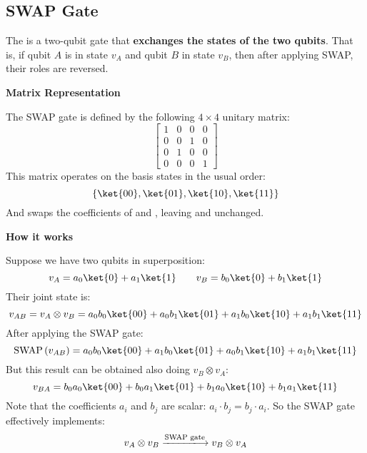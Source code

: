 \subsection{SWAP Gate}

The  is a two-qubit gate that \textbf{exchanges the states of the two qubits}. That is, if qubit $A$ is in state $v_{A}$ and qubit $B$ in state $v_{B}$, then after applying SWAP, their roles are reversed.

\highspace
\begin{flushleft}
    \textcolor{Green3}{ \textbf{Matrix Representation}}
\end{flushleft}
The SWAP gate is defined by the following $4 \times 4$ unitary matrix:
\begin{equation}
    \begin{bmatrix}
        1 & 0 & 0 & 0 \\
        0 & 0 & 1 & 0 \\
        0 & 1 & 0 & 0 \\
        0 & 0 & 0 & 1
    \end{bmatrix}
\end{equation}
This matrix operates on the basis states in the usual order:
\begin{equation*}
    \left\{\ket{00}, \ket{01}, \ket{10}, \ket{11}\right\}
\end{equation*}
And swaps the coefficients of  and , leaving  and  unchanged.

\highspace
\begin{flushleft}
    \textcolor{Green3}{ \textbf{How it works}}
\end{flushleft}
Suppose we have two qubits in superposition:
\begin{equation*}
    v_{A} = a_{0}\ket{0} + a_{1}\ket{1} \hspace{2em} v_{B} = b_{0}\ket{0} + b_{1}\ket{1}
\end{equation*}
Their joint state is:
\begin{equation*}
    v_{AB} = v_{A} \otimes v_{B} = a_{0}b_{0}\ket{00} + a_{0}b_{1}\ket{01} + a_{1}b_{0}\ket{10} + a_{1}b_{1}\ket{11}
\end{equation*}
After applying the SWAP gate:
\begin{equation*}
    \text{SWAP}\left(v_{AB}\right) = a_{0}b_{0}\ket{00} + a_{1}b_{0}\ket{01} + a_{0}b_{1}\ket{10} + a_{1}b_{1}\ket{11}
\end{equation*}
But this result can be obtained also doing $v_{B} \otimes v_{A}$:
\begin{equation*}
    v_{BA} = b_{0}a_{0}\ket{00} + b_{0}a_{1}\ket{01} + b_{1}a_{0}\ket{10} + b_{1}a_{1}\ket{11}
\end{equation*}
Note that the coefficients $a_{i}$ and $b_{j}$ are scalar: $a_{i} \cdot b_{j} = b_{j} \cdot a_{i}$. So the SWAP gate effectively implements:
\begin{equation}
    v_{A} \otimes v_{B} \xlongrightarrow{\text{SWAP gate}} v_{B} \otimes v_{A}
\end{equation}

